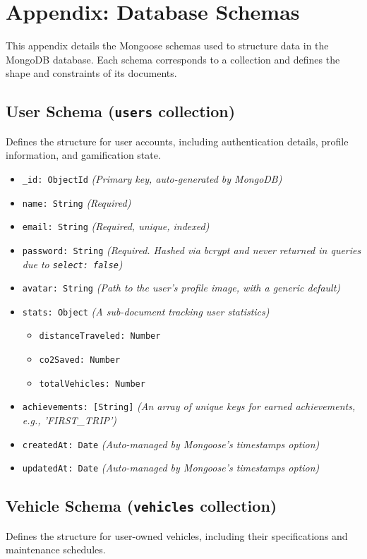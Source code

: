 \chapter{Appendix: Database Schemas}

This appendix details the Mongoose schemas used to structure data in the MongoDB database. Each schema corresponds to a collection and defines the shape and constraints of its documents.

\section{User Schema (\texttt{users} collection)}
Defines the structure for user accounts, including authentication details, profile information, and gamification state.

\begin{itemize}
    \item \texttt{\_id: ObjectId} \textit{(Primary key, auto-generated by MongoDB)}
    \item \texttt{name: String} \textit{(Required)}
    \item \texttt{email: String} \textit{(Required, unique, indexed)}
    \item \texttt{password: String} \textit{(Required. Hashed via bcrypt and never returned in queries due to \texttt{select: false})}
    \item \texttt{avatar: String} \textit{(Path to the user's profile image, with a generic default)}
    \item \texttt{stats: Object} \textit{(A sub-document tracking user statistics)}
        \begin{itemize}
            \item \texttt{distanceTraveled: Number}
            \item \texttt{co2Saved: Number}
            \item \texttt{totalVehicles: Number}
        \end{itemize}
    \item \texttt{achievements: [String]} \textit{(An array of unique keys for earned achievements, e.g., 'FIRST\_TRIP')}
    \item \texttt{createdAt: Date} \textit{(Auto-managed by Mongoose's timestamps option)}
    \item \texttt{updatedAt: Date} \textit{(Auto-managed by Mongoose's timestamps option)}
\end{itemize}

\section{Vehicle Schema (\texttt{vehicles} collection)}
Defines the structure for user-owned vehicles, including their specifications and maintenance schedules.

